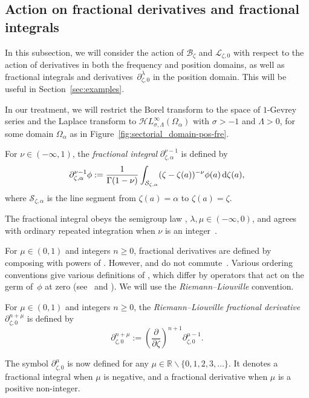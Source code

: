 \documentclass[pdftex]{sigma}
\newcommand{\singexp}[2]{\mathcal{H}L^\infty_{#1, #2}}
\newcommand{\R}{\mathbb{R}}
\newcommand{\fracderiv}[3]{\partial^{#1}_{#2, #3}}
\newcommand{\laplace}{\mathcal{L}}
\newcommand{\borel}{\mathcal{B}}
\numberwithin{equation}{section}
\begin{document}
\subsection{Action on fractional derivatives and fractional integrals}\label{sec:frac-diff-laplace}
In this subsection, we will consider the action of $\borel_\zeta$ and $\laplace_{\zeta,0}$ with respect to the action of derivatives in both the frequency and position domains, as well as fractional integrals and derivatives~$\fracderiv{\lambda}{\zeta}{0}$ in the position domain. This will be useful in Section~\ref{sec:examples}.

In our treatment, we will restrict the Borel transform to the space of $1$-Gevrey series and the Laplace transform to $\singexp{\sigma}{\Lambda}(\Omega_\alpha)$ with $\sigma>-1$ and $\Lambda>0$, for some domain $\Omega_\alpha$ as in Figure~\ref{fig:sectorial_domain-pos-fre}.
\begin{Definition}
For $\nu \in (-\infty, 1)$, the \textit{fractional integral} $\partial^{\nu-1}_{\zeta, \alpha}$ is defined by
\[ \partial^{\nu-1}_{\zeta, \alpha} \phi := \frac{1}{\Gamma(1-\nu)} \int_{\mathcal{S}_{\zeta,\alpha}} (\zeta-\zeta(a))^{-\nu} \phi(a) \,{\rm d}\zeta(a), \]
where $\mathcal{S}_{\zeta,\alpha}$ is the line segment from $\zeta(a)=\alpha$ to $\zeta(a)=\zeta$.
\end{Definition}
The fractional integral obeys the semigroup law \cite[Section~1.3]{mladenov2014advanced}
\smash{$
\fracderiv{\lambda}{\zeta}{\alpha} \fracderiv{\mu}{\zeta}{\alpha} = \fracderiv{\lambda+\mu}{\zeta}{\alpha} $}, $ \lambda, \mu \in (-\infty, 0)$,
and agrees with ordinary repeated integration when $\nu$ is an integer~\cite[equation~(35)]{mladenov2014advanced}.

For $\mu \in (0, 1)$ and integers $n \ge 0$, fractional derivatives \smash{$\fracderiv{n+\mu}{\zeta}{0}$} are defined by composing \smash{$\fracderiv{\mu-1}{\zeta}{0}$} with powers of \smash{$\frac{\partial}{\partial \zeta}$}. However, \smash{$\fracderiv{\mu-1}{\zeta}{0}$} and \smash{$\frac{\partial}{\partial \zeta}$} do not commute~\cite[equation~(54)]{mladenov2014advanced}. Various ordering conventions give various definitions of \smash{$\fracderiv{n+\mu}{\zeta}{0} \phi$}, which differ by operators that act on the germ of~$\phi$ at zero (see~\cite[Section 1.3]{mladenov2014advanced} and \cite{podlubny}). We will use the {\em Riemann--Liouville} convention.

\begin{Definition}\label{definition:frac_driv}
For $\mu \in (0, 1)$ and integers $n \ge 0$, the {\em Riemann--Liouville fractional derivative}~$\fracderiv{n+\mu}{\zeta}{0}$ is defined by
\[ \fracderiv{n+\mu}{\zeta}{0} := \left(\frac{\partial}{\partial \zeta}\right)^{n+1} \fracderiv{\mu-1}{\zeta}{0}. \]
\end{Definition}
The symbol $\fracderiv{\mu}{\zeta}{0}$ is now defined for any $\mu \in \R \smallsetminus \{0, 1, 2, 3, \dots\}$. It denotes a fractional integral when $\mu$ is negative, and a fractional derivative when $\mu$ is a positive non-integer.
\end{document}
